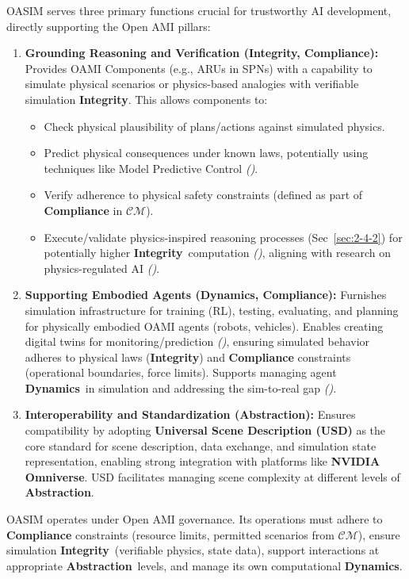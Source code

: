 \documentclass[12pt,a4paper]{report}
\renewcommand{\citep}[1]{\textit{\scriptsize{(\cite{#1})}}}
\newcommand{\Integrity}{\textbf{Integrity}}
\newcommand{\Abstraction}{\textbf{Abstraction}}
\newcommand{\Dynamics}{\textbf{Dynamics}}
\begin{document}
	OASIM serves three primary functions crucial for trustworthy AI development, directly supporting the Open AMI pillars:
	\begin{enumerate}
		\item \textbf{Grounding Reasoning and Verification (\Integrity, \textbf{Compliance}):} Provides OAMI Components (e.g., ARUs in SPNs) with a capability to simulate physical scenarios or physics-based analogies with verifiable simulation \Integrity. This allows components to:
		\begin{itemize}
			\item Check physical plausibility of plans/actions against simulated physics.
			\item Predict physical consequences under known laws, potentially using techniques like Model Predictive Control \citep{Berg2025DigitalTwin}.
			\item Verify adherence to physical safety constraints (defined as part of \textbf{Compliance} in $\mathcal{CM}$).
			\item Execute/validate physics-inspired reasoning processes (Sec~\ref{sec:2-4-2}) for potentially higher \Integrity\ computation \citep{Physics-InspiredReasoning_Ref14, Physics-InspiredReasoning_Ref17}, aligning with research on physics-regulated AI \citep{Cao_PhyDRL_2024}.
		\end{itemize}
		\item \textbf{Supporting Embodied Agents (\Dynamics, \textbf{Compliance}):} Furnishes simulation infrastructure for training (RL), testing, evaluating, and planning for physically embodied OAMI agents (robots, vehicles). Enables creating digital twins for monitoring/prediction \citep{Li2025DigitalTwins, Berg2025DigitalTwin}, ensuring simulated behavior adheres to physical laws (\Integrity) and \textbf{Compliance} constraints (operational boundaries, force limits). Supports managing agent \Dynamics\ in simulation and addressing the sim-to-real gap \citep{Josifovski_SCDA_2025, Li2025DigitalTwins}.
		\item \textbf{Interoperability and Standardization (\Abstraction):} Ensures compatibility by adopting \textbf{Universal Scene Description (USD)} as the core standard for scene description, data exchange, and simulation state representation, enabling strong integration with platforms like \textbf{NVIDIA Omniverse}. USD facilitates managing scene complexity at different levels of \Abstraction.
	\end{enumerate}
	OASIM operates under Open AMI governance. Its operations must adhere to \textbf{Compliance} constraints (resource limits, permitted scenarios from $\mathcal{CM}$), ensure simulation \Integrity\ (verifiable physics, state data), support interactions at appropriate \Abstraction\ levels, and manage its own computational \Dynamics.
	
\end{document}
